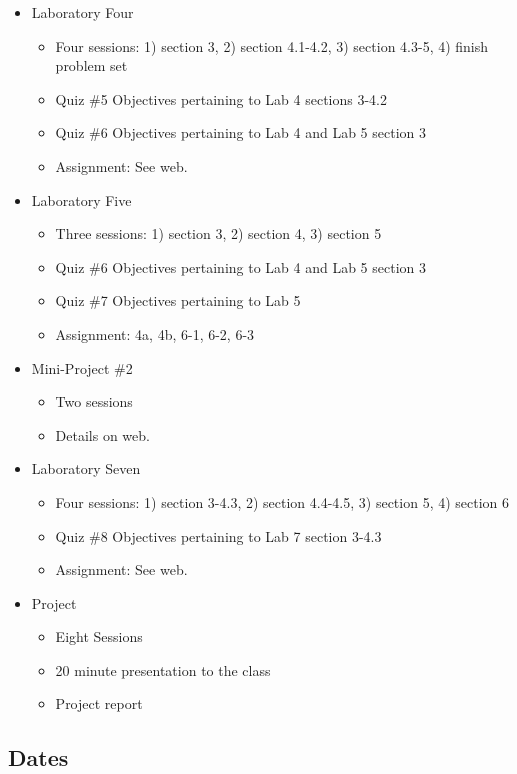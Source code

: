 \documentclass[11pt]{article}
\begin{document}
\begin{itemize}
\begin{itemize}
\end{itemize}
\item Laboratory Four
\begin{itemize}
\item Four sessions: 1) section 3, 2) section 4.1-4.2, 3) section 4.3-5, 4) finish problem set
\item Quiz \#5 Objectives pertaining to Lab 4 sections 3-4.2
\item Quiz \#6 Objectives pertaining to Lab 4 and Lab 5 section 3
\item Assignment: See web.
\end{itemize}
\item Laboratory Five
\begin{itemize}
\item Three sessions: 1) section 3, 2) section 4, 3) section 5
\item Quiz \#6 Objectives pertaining to Lab 4 and Lab 5 section 3
\item Quiz \#7 Objectives pertaining to Lab 5
\item Assignment: 4a, 4b, 6-1, 6-2, 6-3
\end{itemize}
\item Mini-Project \#2
\begin{itemize}
\item Two sessions
\item Details on web.
\end{itemize}
\item Laboratory Seven
\begin{itemize}
\item Four sessions: 1) section 3-4.3, 2) section 4.4-4.5, 3) section 5, 4) section 6
\item Quiz \#8 Objectives pertaining to Lab 7 section 3-4.3
\item Assignment: See web.
\end{itemize}
\item Project
\begin{itemize}
\item Eight Sessions
\item 20 minute presentation to the class
\item Project report
\end{itemize}
\end{itemize}

\subsection*{Dates}
\end{document}
